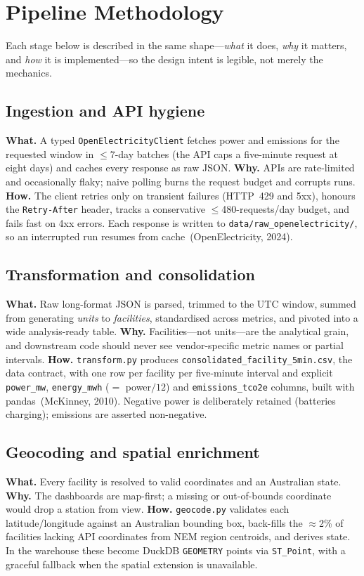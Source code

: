 \documentclass[onecolumn,11pt]{IEEEtran}
\begin{document}
\section{Pipeline Methodology}\label{sec:method}
Each stage below is described in the same shape---\emph{what} it does,
\emph{why} it matters, and \emph{how} it is implemented---so the design intent is
legible, not merely the mechanics.

\subsection{Ingestion and API hygiene}
\textbf{What.} A typed \texttt{OpenElectricityClient} fetches power and emissions
for the requested window in $\leq$7-day batches (the API caps a five-minute
request at eight days) and caches every response as raw JSON.
\textbf{Why.} APIs are rate-limited and occasionally flaky; naive polling burns
the request budget and corrupts runs. \textbf{How.} The client retries only on
transient failures (HTTP~429 and 5xx), honours the \texttt{Retry-After} header,
tracks a conservative $\leq$480-requests/day budget, and fails fast on 4xx
errors. Each response is written to \texttt{data/raw\_openelectricity/}, so an
interrupted run resumes from cache~(OpenElectricity, 2024).

\subsection{Transformation and consolidation}
\textbf{What.} Raw long-format JSON is parsed, trimmed to the UTC window, summed
from generating \emph{units} to \emph{facilities}, standardised across metrics,
and pivoted into a wide analysis-ready table. \textbf{Why.} Facilities---not
units---are the analytical grain, and downstream code should never see
vendor-specific metric names or partial intervals. \textbf{How.}
\texttt{transform.py} produces \texttt{consolidated\_facility\_5min.csv}, the
data contract, with one row per facility per five-minute interval and explicit
\texttt{power\_mw}, \texttt{energy\_mwh} ($=$ power$/12$) and
\texttt{emissions\_tco2e} columns, built with pandas~(McKinney, 2010). Negative
power is deliberately retained (batteries charging); emissions are asserted
non-negative.

\subsection{Geocoding and spatial enrichment}
\textbf{What.} Every facility is resolved to valid coordinates and an Australian
state. \textbf{Why.} The dashboards are map-first; a missing or out-of-bounds
coordinate would drop a station from view. \textbf{How.} \texttt{geocode.py}
validates each latitude/longitude against an Australian bounding box, back-fills
the $\approx$2\% of facilities lacking API coordinates from NEM region centroids,
and derives state. In the warehouse these become DuckDB \texttt{GEOMETRY} points
via \texttt{ST\_Point}, with a graceful fallback when the spatial extension is
unavailable.
\end{document}
